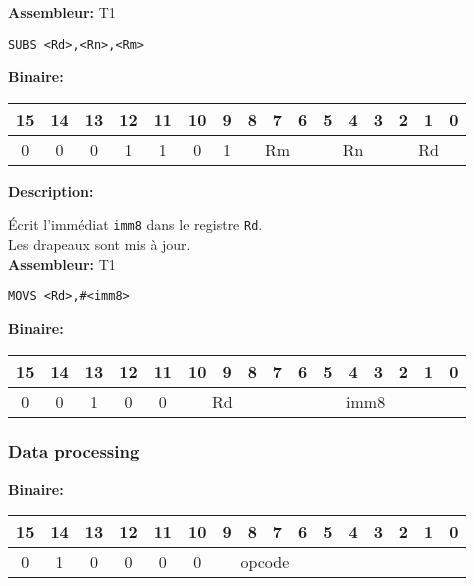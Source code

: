 \textbf{Assembleur:} T1

\begin{lstlisting}
SUBS <Rd>,<Rn>,<Rm>
\end{lstlisting}

\textbf{Binaire:}\\

\begin{tabular}{| c c c c c c c c c c c c c c c c |}
\hline
15 & 14 & 13 & \multicolumn{1}{|c}{12} & 11 & \multicolumn{1}{|c}{10} & \multicolumn{1}{|c}{9} & \multicolumn{1}{|c}{8} & 7 & 6 & \multicolumn{1}{|c}{5} & 4 & 3 & \multicolumn{1}{|c}{2} & 1 & 0 \\
\hline   
0 & 0 & 0 & \multicolumn{1}{|c}{1} & 1 &  \multicolumn{1}{|c}{0} & \multicolumn{1}{|c}{1} & \multicolumn{3}{|c|}{Rm} & \multicolumn{3}{|c|}{Rn} & \multicolumn{3}{|c|}{Rd} \\
\hline
\end{tabular}


\textbf{Description: }

Écrit l'immédiat \texttt{imm8} dans le registre \texttt{Rd}.\\
Les drapeaux sont mis à jour.\\

\textbf{Assembleur:} T1

\begin{lstlisting}
MOVS <Rd>,#<imm8>
\end{lstlisting}

\textbf{Binaire:}\\

\begin{tabular}{| c c c c c c c c c c c c c c c c |}
\hline
15 & 14 & 13 & \multicolumn{1}{|c}{12} & 11 & \multicolumn{1}{|c}{10} & 9 & 8 & \multicolumn{1}{|c}{7} & 6 & 5 & 4 & 3 & 2 & 1 & 0 \\
\hline
0 & 0 & 1 & \multicolumn{1}{|c}{0} & 0 & \multicolumn{3}{|c|}{Rd} & \multicolumn{8}{|c|}{imm8} \\
\hline
\end{tabular}


\subsubsection{Data processing}

\textbf{Binaire:}\\

\begin{tabular}{| c c c c c c c c c c c c c c c c |}
\hline
15 & 14 & 13 & 12 & 11 & 10 & \multicolumn{1}{|c}{9} & 8 & 7 & 6 & \multicolumn{1}{|c}{5} & 4 & 3 & 2 & 1 & 0 \\
\hline
0 & 1 & 0 & 0 & 0 & 0 & \multicolumn{4}{|c}{opcode} & \multicolumn{6}{|c|}{} \\
\hline
\end{tabular}

